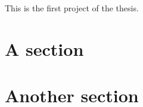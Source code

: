 This is the first project of the thesis.

\lipsum[1]

\section{A section}
\lipsum[2]

\section{Another section}
\lipsum[3]